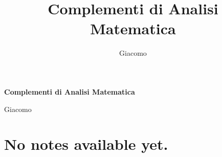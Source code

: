 \documentclass{article}
\title{Complementi di Analisi Matematica}
\author{Giacomo}
\begin{document}
\begin{titlepage}

    \centering
    {\Huge\bfseries Complementi di Analisi Matematica\par}
    \vspace{1.5cm}
    {\large Giacomo\par}
\end{titlepage}






\section*{No notes available yet.}
\end{document}
